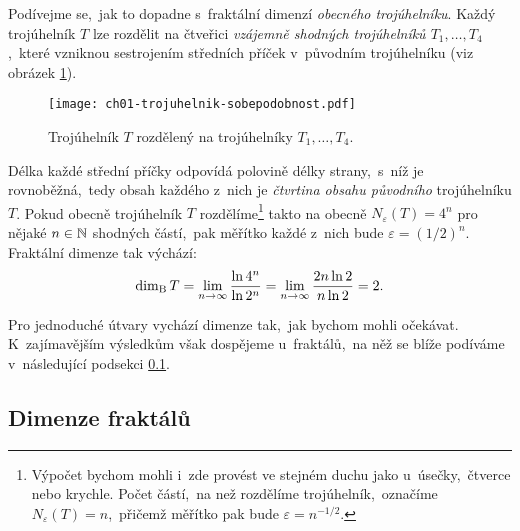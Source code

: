 \begin{example}\label{ex:fraktalni-dimenze-trojuhelnik}
    Podívejme se,~jak to dopadne s~fraktální dimenzí \emph{obecného trojúhelníku}. Každý trojúhelník $T$ lze rozdělit na čtveřici \emph{vzájemně shodných trojúhelníků $T_1,\dots,T_4$},~které vzniknou sestrojením středních příček v~původním trojúhelníku (viz obrázek \ref{fig:trojuhelnik-sobepodobnost}).
    \begin{figure}[h]
        \centering
        \texttt{[image: ch01-trojuhelnik-sobepodobnost.pdf]}
        \caption{Trojúhelník $T$ rozdělený na trojúhelníky $T_1,\dots,T_4$.}
        \label{fig:trojuhelnik-sobepodobnost}
    \end{figure}
    Délka každé střední příčky odpovídá polovině délky strany,~s~níž je rovnoběžná,~tedy obsah každého z~nich je \emph{čtvrtina obsahu původního} trojúhelníku $T$. Pokud obecně trojúhelník $T$ rozdělíme\footnote{Výpočet bychom mohli i~zde provést ve stejném duchu jako u~úsečky,~čtverce nebo krychle. Počet částí,~na než rozdělíme trojúhelník,~označíme $N_\varepsilon(T)=n$,~přičemž měřítko pak bude $\varepsilon=n^{-1/2}$.} takto na obecně $N_\varepsilon(T)=4^n$ pro nějaké $n\in\mathbb{N}$ shodných částí,~pak měřítko každé z~nich bude $\varepsilon=(1/2)^n$. Fraktální dimenze tak výchází:
    \[\operatorname{dim_B}{T}=\lim_{n\to\infty}{\dfrac{\ln{4^n}}{\ln{2^n}}}=\lim_{n\to\infty}{\dfrac{2n\ln{2}}{n\ln{2}}}=2.\]
\end{example}
Pro jednoduché útvary vychází dimenze tak,~jak bychom mohli očekávat. K~zajímavějším výsledkům však dospějeme u~fraktálů,~na něž se blíže podíváme v~následující podsekci \ref{subsec:dimenze-fraktalu}.

\subsection{Dimenze fraktálů}\label{subsec:dimenze-fraktalu}

